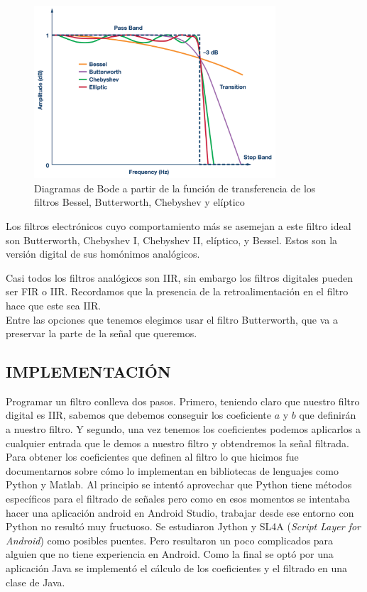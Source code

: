 \begin{figure}[th]
\centering
\includegraphics[width=9cm]{Figures/4filters}
\decoRule
\caption[4filters]{Diagramas de Bode a partir de la función de transferencia de los filtros Bessel, Butterworth, Chebyshev y elíptico}
\label{fig:4filters}
\end{figure}

Los filtros electrónicos cuyo comportamiento más se asemejan a este filtro ideal son Butterworth, Chebyshev I, Chebyshev II, elíptico, y Bessel. Estos son la versión digital de sus homónimos analógicos.

Casi todos los filtros analógicos son IIR, sin embargo los filtros digitales pueden ser FIR o IIR. Recordamos que la presencia de la retroalimentación en el filtro hace que este sea IIR. \\

Entre las opciones que tenemos elegimos usar el filtro Butterworth, que va a preservar la parte de la señal que queremos.

\subsection{IMPLEMENTACIÓN}

Programar un filtro conlleva dos pasos. Primero, teniendo claro que nuestro filtro digital es IIR, sabemos que debemos conseguir los coeficiente $a$ y $b$ que definirán a nuestro filtro. Y segundo, una vez tenemos los coeficientes podemos aplicarlos a cualquier entrada que le demos a nuestro filtro y obtendremos la señal filtrada.\\

Para obtener los coeficientes que definen al filtro lo que hicimos fue documentarnos sobre cómo lo implementan en bibliotecas de lenguajes como Python y Matlab. 
Al principio se intentó aprovechar que Python tiene métodos específicos para el filtrado de señales pero como en esos momentos se intentaba hacer una aplicación android en Android Studio, trabajar desde ese entorno con Python no resultó muy fructuoso. Se estudiaron Jython y SL4A (\emph{Script Layer for Android}) como posibles puentes. Pero resultaron un poco complicados para alguien que no tiene experiencia en Android. Como la final se optó por una aplicación Java se implementó el cálculo de los coeficientes y el filtrado en una clase de Java. \\

